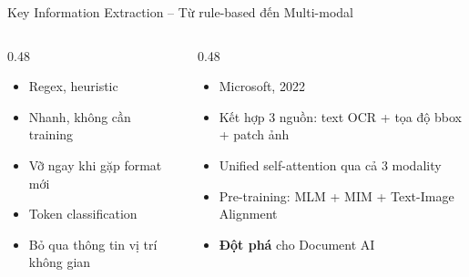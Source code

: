 \documentclass[aspectratio=169, 10pt]{beamer}
\begin{document}
\begin{frame}{Key Information Extraction -- Từ rule-based đến Multi-modal}
 \begin{columns}[T]
 \begin{column}{0.48\textwidth}
 \begin{tcolorbox}[colback=gray!8, colframe=graytext, title={Thế hệ 1 -- Rule-based}, fonttitle=\bfseries, rounded corners, boxrule=0.5pt]
 \begin{itemize}
 \item Regex, heuristic
 \item Nhanh, không cần training
 \item Vỡ ngay khi gặp format mới
 \end{itemize}
 \end{tcolorbox}
 \vspace{0.2cm}
 \begin{tcolorbox}[colback=orange!8, colframe=warning, title={Thế hệ 2 -- BERT NER}, fonttitle=\bfseries, rounded corners, boxrule=0.5pt]
 \begin{itemize}
 \item Token classification
 \item Bỏ qua thông tin vị trí không gian
 \end{itemize}
 \end{tcolorbox}
 \end{column}
 \begin{column}{0.48\textwidth}
 \begin{tcolorbox}[colback=accentlight, colframe=accent, title={Thế hệ 3 -- LayoutLMv3}, fonttitle=\bfseries, rounded corners, boxrule=0.8pt]
 \begin{itemize}
 \item Microsoft, 2022
 \item Kết hợp 3 nguồn: text OCR + tọa độ bbox + patch ảnh
 \item Unified self-attention qua cả 3 modality
 \item Pre-training: MLM + MIM + Text-Image Alignment
 \item \textbf{Đột phá} cho Document AI
 \end{itemize}
 \end{tcolorbox}
 \end{column}
 \end{columns}
\end{frame}

\end{document}
